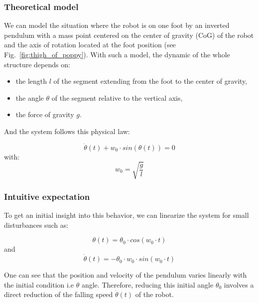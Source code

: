 \subsubsection{Theoretical model} %
\label{sub:exp_theoritical_model}

We can model the situation where the robot is on one foot by an inverted pendulum with a mass point centered on the center of gravity (CoG) of the robot and the axis of rotation located at the foot position (see Fig.~\ref{fig:thigh_of_poppy}). With such a model, the dynamic of the whole structure depends on:

\begin{itemize}
    \item the length $l$ of the segment extending from the foot to the center of gravity,
    \item the angle $\theta$ of the segment relative to the vertical axis,
    \item the force of gravity $g$.
\end{itemize}

And the system follows this physical law:

\begin{equation}
    \ddot{\theta}(t) + w_0 \cdot sin(\theta(t)) = 0
\end{equation}
with:
\begin{equation}
    w_0 = \sqrt{\frac{g}{l}}
\end{equation}

\subsubsection{Intuitive expectation} %

To get an initial insight into this behavior, we can linearize the system for small disturbances such as:

\begin{equation}
    \theta(t) = \theta_0 \cdot cos(w_0\cdot t)
\end{equation}
and
\begin{equation}
    \dot{\theta}(t) = -\theta_0 \cdot w_0 \cdot sin(w_0\cdot t)
\end{equation}

One can see that the position and velocity of the pendulum varies linearly with the initial condition i.e $\theta$ angle. Therefore, reducing this initial angle $\theta_0$ involves a direct reduction of the falling speed $\dot{\theta}(t)$ of the robot.

